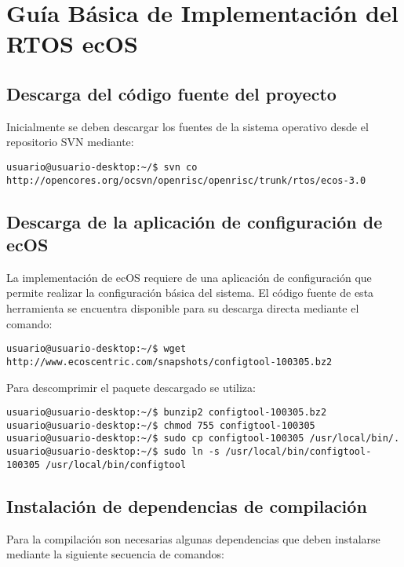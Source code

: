 \chapter{Guía Básica de Implementación del RTOS ecOS} \label{app:apendice4}

\section{Descarga del código fuente del proyecto}

Inicialmente se deben descargar los fuentes de la sistema operativo desde el repositorio SVN mediante:

\begin{lstlisting}[breaklines]
 usuario@usuario-desktop:~/$ svn co http://opencores.org/ocsvn/openrisc/openrisc/trunk/rtos/ecos-3.0
\end{lstlisting}

\section{Descarga de la aplicación de configuración de ecOS}

La implementación de ecOS requiere de una aplicación de configuración que permite realizar la configuración básica del sistema. El código fuente de
esta herramienta se encuentra disponible para su descarga directa mediante el comando:

\begin{lstlisting}[breaklines]
 usuario@usuario-desktop:~/$ wget http://www.ecoscentric.com/snapshots/configtool-100305.bz2
\end{lstlisting}

Para descomprimir el paquete descargado se utiliza:

\begin{lstlisting}[breaklines]
usuario@usuario-desktop:~/$ bunzip2 configtool-100305.bz2
usuario@usuario-desktop:~/$ chmod 755 configtool-100305
usuario@usuario-desktop:~/$ sudo cp configtool-100305 /usr/local/bin/.
usuario@usuario-desktop:~/$ sudo ln -s /usr/local/bin/configtool-100305 /usr/local/bin/configtool
\end{lstlisting}

\section{Instalación de dependencias de compilación}

Para la compilación son necesarias algunas dependencias que deben instalarse mediante la siguiente secuencia de comandos:

